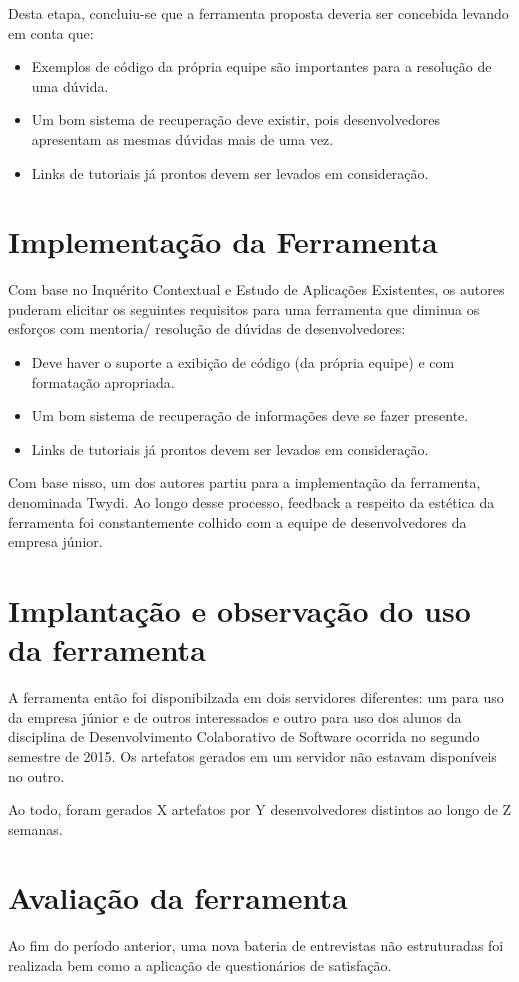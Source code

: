 Desta etapa, concluiu-se que a ferramenta proposta deveria ser concebida levando em conta que:

\begin{itemize}
  \item Exemplos de código da própria equipe são importantes para a resolução de uma dúvida.
  \item Um bom sistema de recuperação deve existir, pois desenvolvedores apresentam as mesmas dúvidas mais de uma vez.
  \item Links de tutoriais já prontos devem ser levados em consideração.
\end{itemize}

\section{Implementação da Ferramenta}

Com base no Inquérito Contextual e Estudo de Aplicações Existentes, os autores puderam elicitar os seguintes requisitos para uma ferramenta que diminua os esforços com mentoria/ resolução de dúvidas de desenvolvedores:

\begin{itemize}
  \item Deve haver o suporte a exibição de código (da própria equipe) e com formatação apropriada.
  \item Um bom sistema de recuperação de informações deve se fazer presente.
  \item Links de tutoriais já prontos devem ser levados em consideração.
\end{itemize}

Com base nisso, um dos autores partiu para a implementação da ferramenta, denominada Twydi. Ao longo desse processo, feedback a respeito da estética da ferramenta foi constantemente colhido com a equipe de desenvolvedores da empresa júnior.

\section{Implantação e observação do uso da ferramenta}

A ferramenta então foi disponibilzada em dois servidores diferentes: um para uso da empresa júnior e de outros interessados e outro para uso dos alunos da disciplina de Desenvolvimento Colaborativo de Software ocorrida no segundo semestre de 2015. Os artefatos gerados em um servidor não estavam disponíveis no outro.

Ao todo, foram gerados X artefatos por Y desenvolvedores distintos ao longo de Z semanas.

\section{Avaliação da ferramenta}

Ao fim do período anterior, uma nova bateria de entrevistas não estruturadas foi realizada bem como a aplicação de questionários de satisfação.
